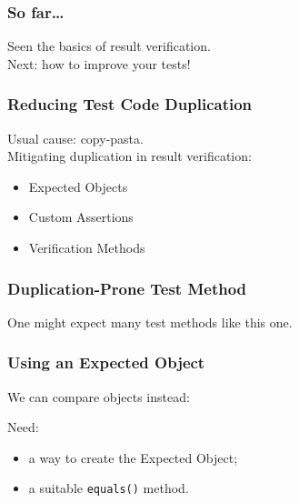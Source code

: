 \documentclass{beamer}
\newenvironment{changemargin}[1]{%
  \begin{list}{}{%
    \setlength{\topsep}{0pt}%
    \setlength{\leftmargin}{#1}%
    \setlength{\rightmargin}{1em}
    \setlength{\listparindent}{\parindent}%
    \setlength{\itemindent}{\parindent}%
    \setlength{\parsep}{\parskip}%
  }%
  \item[]}{\end{list}}
\begin{document}
\begin{frame}
  \frametitle{So far\ldots}
  \Large
  \begin{changemargin}{2cm}
    Seen the basics of result verification.\\[1em]
    Next: how to improve your tests!
  \end{changemargin}
\end{frame}

\begin{frame}
  \frametitle{Reducing Test Code Duplication}
  \Large
  \begin{changemargin}{2cm}
    Usual cause: copy-pasta.\\[1em]

    Mitigating duplication in result verification:
    \begin{itemize}
    \item Expected Objects
    \item Custom Assertions
    \item Verification Methods
    \end{itemize}
  \end{changemargin}
\end{frame}

\begin{frame}
  \frametitle{Duplication-Prone Test Method}
  \begin{changemargin}{1.5cm}
    \large
    One might expect many test methods like this one.
  \end{changemargin}
  \small
    
\end{frame}

\begin{frame}
  \frametitle{Using an Expected Object}
  \begin{changemargin}{1.5cm}
    \large
    We can compare objects instead:
  \end{changemargin}
  \small
  \begin{changemargin}{1cm}
    
  \end{changemargin}
  \begin{changemargin}{1.5cm}
    \large
    Need:
    \begin{itemize}
    \item a way to create the Expected Object;
    \item a suitable {\tt equals()} method.
    \end{itemize}
  \end{changemargin}
\end{frame}
\end{document}
